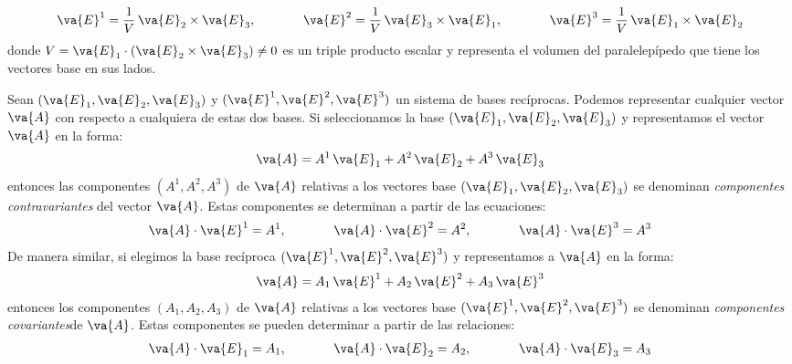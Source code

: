 \begin{align*}
\va{E}^{1} = \dfrac{1}{V} \, \va{E}_{2} \times \va{E}_{3}, \hspace{1.3cm} \va{E}^{2} = \dfrac{1}{V} \, \va{E}_{3} \times \va{E}_{1}, \hspace{1.3cm} \va{E}^{3} = \dfrac{1}{V} \, \va{E}_{1} \times \va{E}_{2}
\end{align*}
donde $V = \va{E}_{1} \cdot (\va{E}_{2} \times \va{E}_{3}) \neq 0$ es un triple producto escalar y representa el volumen del paralelepípedo que tiene los vectores base en sus lados.
\par
Sean $(\va{E}_{1}, \va{E}_{2}, \va{E}_{3})$ y $(\va{E}^{1}, \va{E}^{2}, \va{E}^{3})$ un sistema de bases recíprocas. Podemos representar cualquier vector $\va{A}$ con respecto a cualquiera de estas dos bases. Si seleccionamos la base $(\va{E}_{1}, \va{E}_{2}, \va{E}_{3})$ y representamos el vector $\va{A}$ en la forma:
\begin{align}
\va{A} = A^{1} \, \va{E}_{1} + A^{2} \, \va{E}_{2} + A^{3} \, \va{E}_{3}
\label{ec:ecuacion_02_01}
\end{align}
entonces las componentes $(A^{1}, A^{2}, A^{3})$ de $\va{A}$ relativas a los vectores base $(\va{E}_{1}, \va{E}_{2}, \va{E}_{3})$ se denominan \emph{componentes contravariantes} del vector $\va{A}$. Estas componentes se determinan a partir de las ecuaciones:
\begin{align*}
\va{A} \cdot \va{E}^{1} = A^{1}, \hspace{1.3cm} \va{A} \cdot \va{E}^{2} = A^{2}, \hspace{1.3cm} \va{A} \cdot \va{E}^{3} = A^{3}
\end{align*}
De manera similar, si elegimos la base recíproca $(\va{E}^{1}, \va{E}^{2}, \va{E}^{3})$ y representamos a $\va{A}$ en la forma:
\begin{align}
\va{A} = A_{1} \, \va{E}^{1} + A_{2} \, \va{E}^{2} + A_{3} \, \va{E}^{3}
\label{ec:ecuacion_02_02}
\end{align}
entonces los componentes $(A_{1}, A_{2}, A_{3})$ de $\va{A}$ relativas a los vectores base $(\va{E}^{1}, \va{E}^{2}, \va{E}^{3})$ se denominan \emph{componentes covariantes}de $\va{A}$. Estas componentes se pueden determinar a partir de las relaciones:
\begin{align*}
\va{A} \cdot \va{E}_{1} = A_{1}, \hspace{1.3cm} \va{A} \cdot \va{E}_{2} = A_{2}, \hspace{1.3cm} \va{A} \cdot \va{E}_{3} = A_{3}
\end{align*}    
